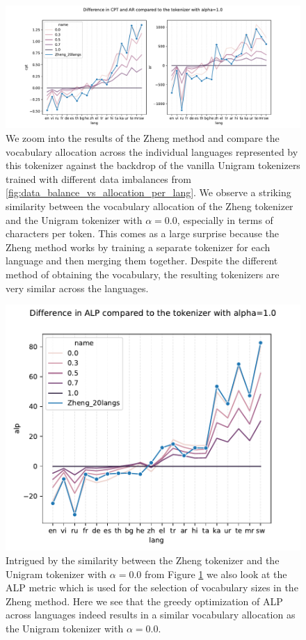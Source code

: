 \begin{figure}[H]
    \centering
    \includegraphics[width=\textwidth]{figures/zheng_vs_alphas.pdf}
    \caption{We zoom into the results of the Zheng method and compare the vocabulary allocation across the individual languages represented by this tokenizer against the backdrop of the vanilla Unigram tokenizers trained with different data imbalances from \ref{fig:data_balance_vs_allocation_per_lang}. We observe a striking similarity between the vocabulary allocation of the Zheng tokenizer and the Unigram tokenizer with $\alpha=0.0$, especially in terms of characters per token. This comes as a large surprise because the Zheng method works by training a separate tokenizer for each language and then merging them together. Despite the different method of obtaining the vocabulary, the resulting tokenizers are very similar across the languages.}
    \label{fig:zheng_vs_alphas}
\end{figure}

\begin{figure}[H]
    \centering
    \includegraphics[width=\textwidth]{figures/zheng_vs_alphas_alp.pdf}
    \caption{Intrigued by the similarity between the Zheng tokenizer and the Unigram tokenizer with $\alpha=0.0$ from Figure \ref{fig:zheng_vs_alphas} we also look at the ALP metric which is used for the selection of vocabulary sizes in the Zheng method. Here we see that the greedy optimization of ALP across languages indeed results in a similar vocabulary allocation as the Unigram tokenizer with $\alpha=0.0$.}
    \label{fig:zheng_vs_alphas_alp}
\end{figure}



